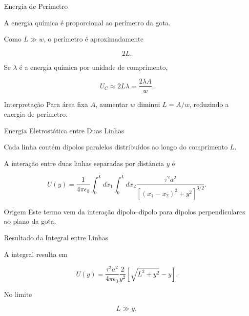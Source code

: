 \documentclass[aspectratio=169]{beamer}
\begin{document}
\begin{frame}{Energia de Perímetro}

A energia química é proporcional ao perímetro da gota.

Como \(L\gg w\), o perímetro é aproximadamente

\[
2L.
\]

Se \(\lambda\) é a energia química por unidade de comprimento,

\begin{eqbox}
\begin{equation}
U_C
\approx
2L\lambda
=
\frac{2\lambda A}{w}.
\tag{4.47}
\label{eq:4.47}
\end{equation}
\end{eqbox}

\begin{mybox}{Interpretação}
Para área fixa \(A\), aumentar \(w\) diminui \(L=A/w\), reduzindo a energia de perímetro.
\end{mybox}

\end{frame}

\begin{frame}{Energia Eletrostática entre Duas Linhas}

Cada linha contém dipolos paralelos distribuídos ao longo do comprimento \(L\).

A interação entre duas linhas separadas por distância \(y\) é

\begin{eqbox}
\begin{equation}
U(y)
=
\frac{1}{4\pi\epsilon_0}
\int_0^L dx_1
\int_0^L dx_2
\frac{\tau^2a^2}
{\left[(x_1-x_2)^2+y^2\right]^{3/2}}.
\tag{4.48a}
\label{eq:4.48a}
\end{equation}
\end{eqbox}

\begin{mybox}{Origem}
Este termo vem da interação dipolo--dipolo para dipolos perpendiculares ao plano da gota.
\end{mybox}

\end{frame}

\begin{frame}{Resultado da Integral entre Linhas}

A integral resulta em

\begin{eqbox}
\begin{equation}
U(y)
=
\frac{\tau^2a^2}{4\pi\epsilon_0}
\frac{2}{y^2}
\left[
\sqrt{L^2+y^2}-y
\right].
\tag{4.48}
\label{eq:4.48}
\end{equation}
\end{eqbox}

No limite

\[
L\gg y,
\]

\end{frame}
\end{document}

